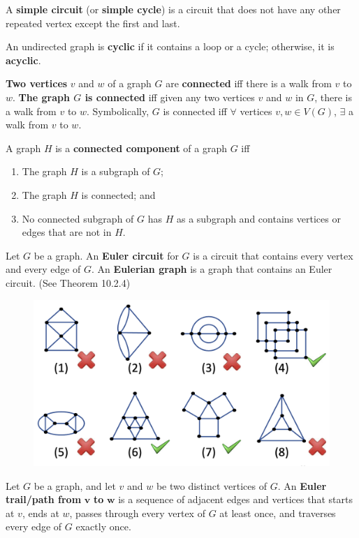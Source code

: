 \documentclass{article}
\begin{document}
\begin{description}
    \item \qquad A \textbf{simple circuit} (or \textbf{simple cycle}) is a circuit that does not have any other repeated vertex except the first and last.
    \item \qquad An undirected graph is \textbf{cyclic} if it contains a loop or a cycle; otherwise, it is \textbf{acyclic}.
    \item[Connectedness]\textbf{Two vertices} $v$ and $w$ of a graph $G$ are \textbf{connected} iff there is a walk from $v$ to $w$. \textbf{The graph $G$ is connected} iff given any two vertices $v$ and $w$ in $G$, there is a walk from $v$ to $w$. Symbolically, $G$ is connected iff $\forall$ vertices $v,w\in V(G)$, $\exists$ a walk from $v$ to $w$.
    \item[Connected Component] A graph $H$ is a \textbf{connected component} of a graph $G$ iff 
    \begin{enumerate}
    	\item The graph $H$ is a subgraph of $G$;
		\item The graph $H$ is connected; and
		\item No connected subgraph of $G$ has $H$ as a subgraph and contains vertices or edges that are not in $H$.
    \end{enumerate}
    \item[Euler Circuit and Eulerian Graph] Let $G$ be a graph. An \textbf{Euler circuit} for $G$ is a circuit that contains every vertex and every edge of $G$. An \textbf{Eulerian graph} is a graph that contains an Euler circuit. (See Theorem 10.2.4)
    \begin{figure}[H]
    	\centering
		\includegraphics[scale=0.3]{euler_circuit}
    \end{figure}
    \item[Euler Trail] Let $G$ be a graph, and let $v$ and $w$ be two distinct vertices of $G$. An \textbf{Euler trail/path from} $\mathbf{v}$ \textbf{to} $\mathbf{w}$ is a sequence of adjacent edges and vertices that starts at $v$, ends at $w$, passes through every vertex of $G$ at least once, and traverses every edge of $G$ exactly once.

\end{description}
\end{document}

